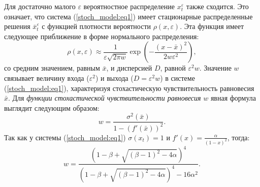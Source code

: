 \documentclass[a4paper, 14pt]{extreport}
\numberwithin{equation}{section}
\numberwithin{figure}{section}
\numberwithin{table}{section}
\begin{document}
				Для достаточно малого $ \varepsilon $ вероятностное распределение $ x^{\varepsilon}_{t} $ также сходится. Это означает, что система (\ref{stoch_model:eq1}) имеет стационарные распределенные решения $ \bar{x}^{\varepsilon}_{t} $ с функцией плотности вероятности $ \rho(x, \varepsilon) $. Эта функция имеет следующее приближение в форме нормального распределения:
				\begin{equation}
					\rho(x, \varepsilon) \approx \frac{1}{\varepsilon \sqrt{2 \pi w}} \exp{\left(- \frac{(x - \bar{x})^{2}}{2 w \varepsilon^{2}}\right)},
				\end{equation}
				со средним значением, равным $ \bar{x} $, и дисперсией $ D $, равной $ \varepsilon^{2} w $. Значение $ w $ связывает величину входа ($ \varepsilon^{2} $) и выхода ($ D = \varepsilon^{2} w $) в системе (\ref{stoch_model:eq1}), характеризуя стохастическую чувствительность равновесия $ \bar{x} $. Для {\it функции стохастической чувствительности равновесия} $ w $ явная формула выглядит следующим образом:
				\begin{equation}
					w = \frac{\sigma^{2}(\bar{x})}{1 - (f'(\bar{x}))^{2}}.
				\end{equation}
				Так как у системы (\ref{stoch_model:eq1}) $ \sigma(x_{t}) = 1 $ и $ f'(x) = \frac{\alpha}{(1 - x)^{2}} $, тогда:
				\begin{equation}
				\label{wvalue:eq1}
					w = \frac{\left(1-\beta+\sqrt{(\beta-1)^{2}-4\alpha}\right)^{4}}{\left(1-\beta+\sqrt{(\beta-1)^{2}-4 \alpha}\right)^{4}-16\alpha^2}.
				\end{equation} %
\end{document}
